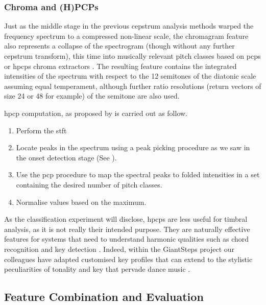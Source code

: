 {{{{\subsubsection{Chroma and (H)PCPs}

Just as the middle stage in the previous cepstrum analysis methods warped the frequency spectrum to a compressed non-linear scale, the chromagram feature also represents a collapse of the spectrogram (though without any further cepstrum transform), this time into musically relevant pitch classes based on \acrfull{pcp}s \citep{Fujishima1999} or \acrfull{hpcp}s \citep{Gomez2004} chroma extractors \citep{Orio2006}. The resulting feature contains the integrated intensities of the spectrum with respect to the 12 semitones of the diatonic scale assuming equal temperament, although further ratio resolutions (return vectors of size 24 or 48 for example) of the semitone are also used.

\acrshort{hpcp} computation, as proposed by \cite{Gomez2006} is carried out as follow. 

\begin{enumerate}
  \item Perform the \acrshort{stft}
  \item Locate peaks in the spectrum using a peak picking procedure as we saw in the onset detection stage (See ).
  \item Use the \acrshort{pcp} procedure to map the spectral peaks to folded intensities in a set containing the desired number of pitch classes.
  \item Normalise values based on the maximum.
\end{enumerate}

As the classification experiment will disclose, \acrshort{hpcp}s are less useful for timbral analysis, as it is not really their intended purpose. They are naturally effective features for systems that need to understand harmonic qualities such as chord recognition \citep{Fujishima1999} and key detection \citep{Gomez2004}. Indeed, within the GiantSteps project our colleagues have adapted customised key profiles that can extend to the stylistic peculiarities of tonality and key that pervade dance music \citep{Faraldo2016, Faraldo2017, Faraldo2017b}.

\subsection{Feature Combination and Evaluation}

}}}}
